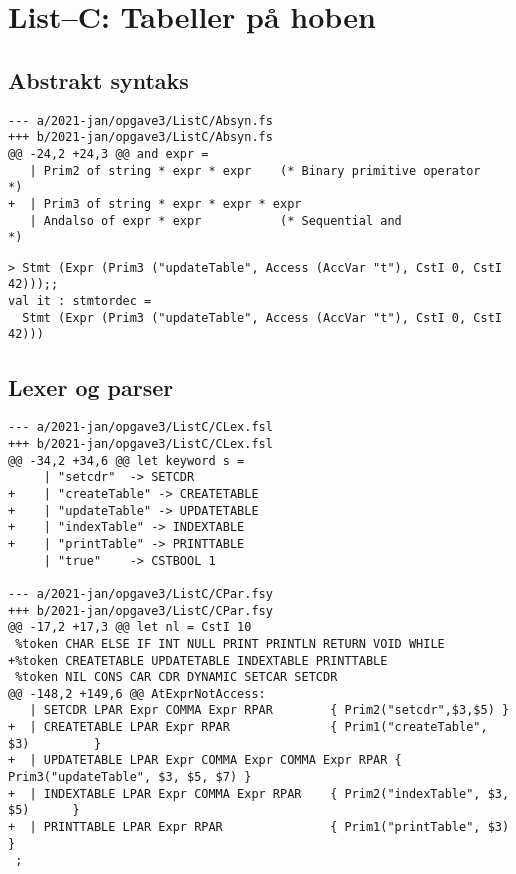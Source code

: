 \section{List–C: Tabeller på hoben}

\subsection{Abstrakt syntaks}

\begin{verbatim}
--- a/2021-jan/opgave3/ListC/Absyn.fs
+++ b/2021-jan/opgave3/ListC/Absyn.fs
@@ -24,2 +24,3 @@ and expr =
   | Prim2 of string * expr * expr    (* Binary primitive operator   *)
+  | Prim3 of string * expr * expr * expr
   | Andalso of expr * expr           (* Sequential and              *)
\end{verbatim}

\begin{verbatim}
> Stmt (Expr (Prim3 ("updateTable", Access (AccVar "t"), CstI 0, CstI 42)));;
val it : stmtordec =
  Stmt (Expr (Prim3 ("updateTable", Access (AccVar "t"), CstI 0, CstI 42)))
\end{verbatim}

\subsection{Lexer og parser}

\begin{verbatim}
--- a/2021-jan/opgave3/ListC/CLex.fsl
+++ b/2021-jan/opgave3/ListC/CLex.fsl
@@ -34,2 +34,6 @@ let keyword s =
     | "setcdr"  -> SETCDR     
+    | "createTable" -> CREATETABLE
+    | "updateTable" -> UPDATETABLE
+    | "indexTable" -> INDEXTABLE
+    | "printTable" -> PRINTTABLE
     | "true"    -> CSTBOOL 1

--- a/2021-jan/opgave3/ListC/CPar.fsy
+++ b/2021-jan/opgave3/ListC/CPar.fsy
@@ -17,2 +17,3 @@ let nl = CstI 10
 %token CHAR ELSE IF INT NULL PRINT PRINTLN RETURN VOID WHILE
+%token CREATETABLE UPDATETABLE INDEXTABLE PRINTTABLE
 %token NIL CONS CAR CDR DYNAMIC SETCAR SETCDR
@@ -148,2 +149,6 @@ AtExprNotAccess:
   | SETCDR LPAR Expr COMMA Expr RPAR        { Prim2("setcdr",$3,$5) }
+  | CREATETABLE LPAR Expr RPAR              { Prim1("createTable", $3)         }
+  | UPDATETABLE LPAR Expr COMMA Expr COMMA Expr RPAR { Prim3("updateTable", $3, $5, $7) }
+  | INDEXTABLE LPAR Expr COMMA Expr RPAR    { Prim2("indexTable", $3, $5)      }
+  | PRINTTABLE LPAR Expr RPAR               { Prim1("printTable", $3)          }
 ;
\end{verbatim}

